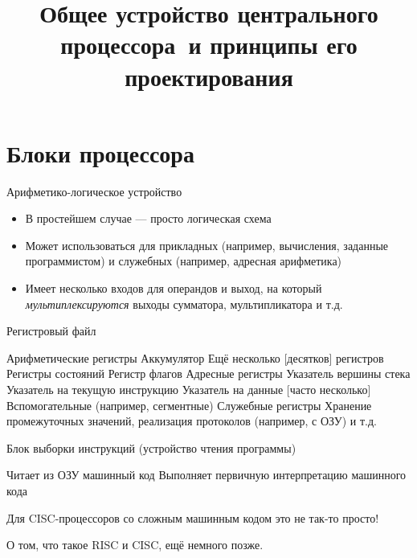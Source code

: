 \documentclass[xetex,aspectratio=43]{beamer}
\title[Устройство и принципы проектирования ЦП]{Общее устройство центрального процессора~и принципы его проектирования}
\begin{document}
    \titleslide

    \tocslide

\section{Блоки процессора}

\begin{frame}{Арифметико-логическое устройство}
    \begin{itemize}
        \item В простейшем случае --- просто логическая схема
        \item Может использоваться для прикладных (например, вычисления, заданные программистом) и служебных (например, адресная арифметика)
        \item Имеет несколько входов для операндов и выход, на который \emph{мультиплексируются} выходы сумматора, мультипликатора и т.д.
    \end{itemize}
\end{frame}

\begin{frame}{Регистровый файл}
    \begin{outline}[itemize]
        \tightlist
        \1 Арифметические регистры
            \2 Аккумулятор
            \2 Ещё несколько [десятков] регистров
        \1 Регистры состояний
            \2 Регистр флагов
        \1 Адресные регистры
            \2 Указатель вершины стека
            \2 Указатель на текущую инструкцию
            \2 Указатель на данные [часто несколько]
            \2 Вспомогательные (например, сегментные)
        \1 Служебные регистры
            \2 Хранение промежуточных значений, реализация протоколов (например, с ОЗУ) и т.д.
    \end{outline}
\end{frame}

\begin{frame}{Блок выборки инструкций (устройство чтения программы)}
    \begin{outline}[itemize]
        \1 Читает из ОЗУ машинный код
            \2 Выполняет первичную интерпретацию машинного кода
    \end{outline}
    Для CISC-процессоров со сложным машинным кодом это не так-то просто!

    \pause
    \alert{О том, что такое RISC и CISC, ещё немного позже.}
\end{frame}
\end{document}
